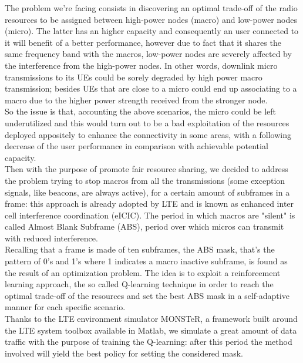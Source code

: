 \documentclass[conference,10pt]{IEEEtran}
\begin{document}
The problem we're facing consists in discovering an optimal trade-off of the radio resources to be assigned between high-power nodes (macro) and low-power nodes (micro). The latter has an higher capacity and consequently an user connected to it will benefit of a better performance, however due to fact that it shares the same frequency band with the macros, low-power nodes are severely affected by the interference from the high-power nodes. In other words, downlink micro transmissions to its UEs could be sorely degraded by high power macro transmission; besides UEs that are close to a micro could end up associating to a macro due to the higher power strength received from the stronger node.\\
So the issue is that, accounting the above scenarios, the micro could be left underutilized and this would turn out to be a bad exploitation of the resources deployed appositely to enhance the connectivity in some areas, with a following decrease of the user performance in comparison with achievable potential capacity.\\
Then with the purpose of promote fair resource sharing, we decided to address the problem trying to stop macros from all the transmissions (some exception signals, like beacons, are always active), for a certain amount of subframes in a frame: this approach is already adopted by LTE and is known as enhanced inter cell interference coordination (eICIC). The period in which macros are "silent" is called Almost Blank Subframe (ABS), period over which micros can transmit with reduced interference.\\
Recalling that a frame is made of ten subframes, the ABS mask, that's the pattern of 0's and 1's where 1 indicates a macro inactive subframe, is found as the result of an optimization problem. The idea is to exploit a reinforcement learning approach, the so called Q-learning technique in order to reach the optimal trade-off of the resources and set the best ABS mask in a self-adaptive manner for each specific scenario.\\
Thanks to the LTE environment simulator MONSTeR, a framework built around the LTE system toolbox available in Matlab, we simulate a great amount of data traffic with the purpose of training the Q-learning: after this period the method involved will yield the best policy for setting the considered mask.
\end{document}
